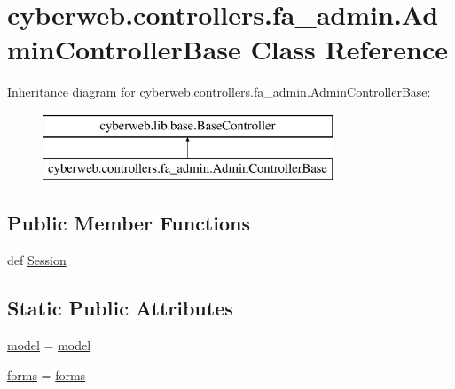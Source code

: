 \hypertarget{classcyberweb_1_1controllers_1_1fa__admin_1_1_admin_controller_base}{\section{cyberweb.\-controllers.\-fa\-\_\-admin.\-Admin\-Controller\-Base \-Class \-Reference}
\label{classcyberweb_1_1controllers_1_1fa__admin_1_1_admin_controller_base}
}
\-Inheritance diagram for cyberweb.\-controllers.\-fa\-\_\-admin.\-Admin\-Controller\-Base\-:\begin{figure}[H]
\begin{center}
\leavevmode
\includegraphics[height=2.000000cm]{classcyberweb_1_1controllers_1_1fa__admin_1_1_admin_controller_base}
\end{center}
\end{figure}
\subsection*{\-Public \-Member \-Functions}
\begin{DoxyCompactItemize}
\item 
def \hyperlink{classcyberweb_1_1controllers_1_1fa__admin_1_1_admin_controller_base_a6981e6401bf2f50af930c98dd2ccf3c2}{\-Session}
\end{DoxyCompactItemize}
\subsection*{\-Static \-Public \-Attributes}
\begin{DoxyCompactItemize}
\item 
\hyperlink{classcyberweb_1_1controllers_1_1fa__admin_1_1_admin_controller_base_a38b54f5ab156dee05848935bad5856d4}{model} = \hyperlink{classcyberweb_1_1controllers_1_1fa__admin_1_1_admin_controller_base_a38b54f5ab156dee05848935bad5856d4}{model}
\item 
\hyperlink{classcyberweb_1_1controllers_1_1fa__admin_1_1_admin_controller_base_ad6e19298773f51a0a75c7b82cb4513f2}{forms} = \hyperlink{classcyberweb_1_1controllers_1_1fa__admin_1_1_admin_controller_base_ad6e19298773f51a0a75c7b82cb4513f2}{forms}
\end{DoxyCompactItemize}



